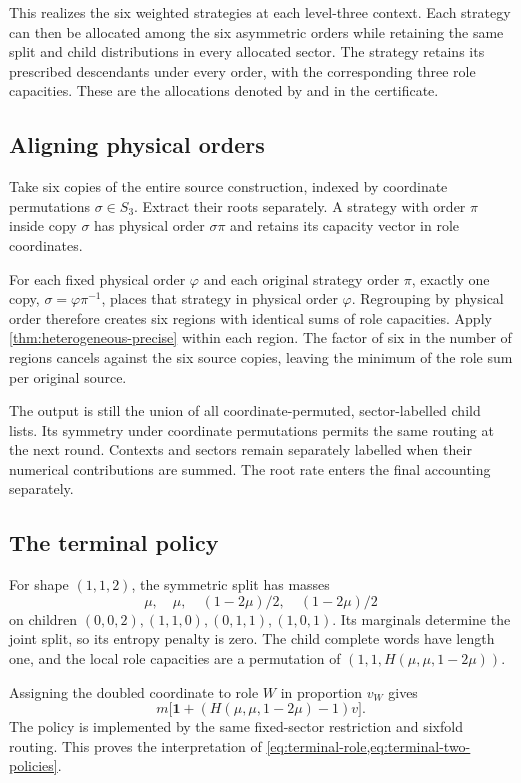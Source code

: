 \documentclass[11pt,a4paper]{article}
\begin{document}
This realizes the six weighted strategies at each level-three context. Each strategy can then be allocated among the six asymmetric orders while retaining the same split and child distributions in every allocated sector. The strategy retains its prescribed descendants under every order, with the corresponding three role capacities. These are the allocations denoted by  and  in the certificate.

\subsection{Aligning physical orders}

Take six copies of the entire source construction, indexed by coordinate permutations $\sigma\in S_3$. Extract their roots separately. A strategy with order $\pi$ inside copy $\sigma$ has physical order $\sigma\pi$ and retains its capacity vector in role coordinates.

For each fixed physical order $\varphi$ and each original strategy order $\pi$, exactly one copy, $\sigma=\varphi\pi^{-1}$, places that strategy in physical order $\varphi$. Regrouping by physical order therefore creates six regions with identical sums of role capacities. Apply \cref{thm:heterogeneous-precise} within each region. The factor of six in the number of regions cancels against the six source copies, leaving the minimum of the role sum per original source.

The output is still the union of all coordinate-permuted, sector-labelled child lists. Its symmetry under coordinate permutations permits the same routing at the next round. Contexts and sectors remain separately labelled when their numerical contributions are summed. The root rate enters the final accounting separately.

\subsection{The terminal policy}

For shape $(1,1,2)$, the symmetric split has masses
\[
\mu,\quad\mu,\quad(1-2\mu)/2,\quad(1-2\mu)/2
\]
on children $(0,0,2),(1,1,0),(0,1,1),(1,0,1)$. Its marginals determine the joint split, so its entropy penalty is zero. The child complete words have length one, and the local role capacities are a permutation of
$(1,1,H(\mu,\mu,1-2\mu))$.

Assigning the doubled coordinate to role $W$ in proportion $v_W$ gives
\[
m\bigl[\mathbf1+(H(\mu,\mu,1-2\mu)-1)v\bigr].
\]
The policy is implemented by the same fixed-sector restriction and sixfold routing. This proves the interpretation of \cref{eq:terminal-role,eq:terminal-two-policies}.
\end{document}
